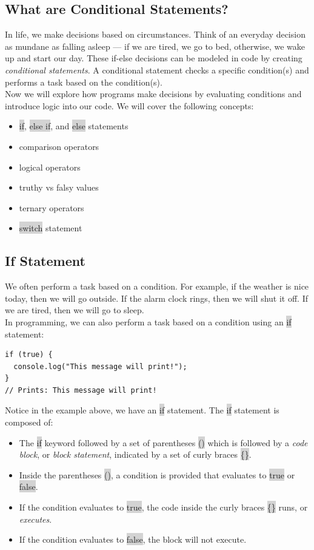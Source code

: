 \documentclass[11pt]{article}
\begin{document}
\subsection{What are Conditional Statements?}
In life, we make decisions based on circumstances. Think of an everyday decision as mundane as falling asleep — if we are tired, we go to bed, otherwise, we wake up and start our day. 
These if-else decisions can be modeled in code by creating \textit{conditional statements}. A conditional statement checks a specific condition(s) and performs a task based on the condition(s). \\
\newline
Now we will explore how programs make decisions by evaluating conditions and introduce logic into our code. We will cover the following concepts:
\begin{itemize}[leftmargin = *]
\item \colorbox{lightgray}{if}, \colorbox{lightgray}{else if}, and \colorbox{lightgray}{else} statements 
\item comparison operators
\item logical operators
\item truthy vs falsy values
\item ternary operators
\item \colorbox{lightgray}{switch} statement
\end{itemize}

\subsection{If Statement}
We often perform a task based on a condition. For example, if the weather is nice today, then we will go outside. If the alarm clock rings, then we will shut it off. If we are tired, then we will go to sleep. \\
\newline
In programming, we can also perform a task based on a condition using an \colorbox{lightgray}{if} statement:
\begin{lstlisting}
if (true) {
  console.log("This message will print!"); 
}
// Prints: This message will print!
\end{lstlisting}
Notice in the example above, we have an \colorbox{lightgray}{if} statement. The \colorbox{lightgray}{if} statement is composed of:
\begin{itemize}[leftmargin = *]
\item The \colorbox{lightgray}{if} keyword followed by a set of parentheses \colorbox{lightgray}{()} which is followed by a \textit{code block}, or \textit{block statement}, indicated by a set of curly braces \colorbox{lightgray}{\{\}}.
\item Inside the parentheses \colorbox{lightgray}{()}, a condition is provided that evaluates to \colorbox{lightgray}{true} or \colorbox{lightgray}{false}.
\item If the condition evaluates to \colorbox{lightgray}{true}, the code inside the curly braces \colorbox{lightgray}{\{\}} runs, or \textit{executes}.
\item If the condition evaluates to \colorbox{lightgray}{false}, the block will not execute.
\end{itemize}
\end{document}

